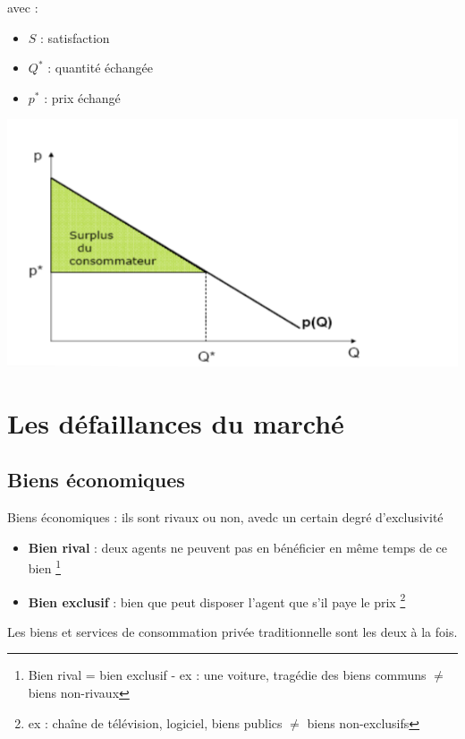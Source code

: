 avec :
\begin{itemize}
    \item $S$ : satisfaction
    \item $Q^{*}$ : quantité échangée
    \item $p^{*}$ : prix échangé
\end{itemize}
\begin{center}
    \includegraphics[scale=0.8]{Pics/surplus_consommateur.png}
\end{center}
\newpage
\section{Les défaillances du marché}
\subsection{Biens économiques}
Biens économiques : ils sont rivaux ou non, avedc un certain degré d'exclusivité
\begin{itemize}
    \item \textbf{Bien rival} : deux agents ne peuvent pas en bénéficier en même temps de ce bien \footnote{Bien rival = bien exclusif - ex : une voiture, tragédie des biens communs $\neq$ biens non-rivaux}
    \item \textbf{Bien exclusif} : bien que peut disposer l'agent que s'il paye le prix \footnote{ex : chaîne de télévision, logiciel, biens publics $\neq$ biens non-exclusifs}
\end{itemize}
Les biens et services de consommation privée traditionnelle sont les deux à la fois.
